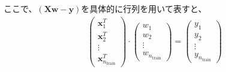 \documentclass{ltjsarticle}
\begin{document}
ここで、$(\boldsymbol{X}\boldsymbol{w} - \boldsymbol{y})$を具体的に行列を用いて表すと、
\begin{align}
  \begin{pmatrix}
    \boldsymbol{x}^T_1\\
    \boldsymbol{x}^T_2\\
    \vdots\\
    \boldsymbol{x}^T_{n_{\text{train}}}
  \end{pmatrix}
 \cdot
  \begin{pmatrix}
    w_1\\
    w_2\\
    \vdots\\
    w_{n_{\text{train}}}
  \end{pmatrix}
=
  \begin{pmatrix}
    y_1\\
    y_2\\
    \vdots\\
    y_{n_{\text{train}}}
  \end{pmatrix}
\end{align}
\fi
\end{document}
